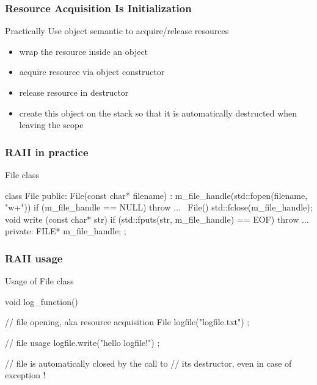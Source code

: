 \begin{frame}
  \frametitle{Resource Acquisition Is Initialization}
  \begin{block}{Practically}
    Use object semantic to acquire/release resources
    \begin{itemize}
    \item wrap the resource inside an object
    \item acquire resource via object constructor
    \item release resource in destructor
    \item create this object on the stack so that it is automatically destructed when leaving the scope
    \end{itemize}
  \end{block}
\end{frame}

\begin{frame}[fragile]
  \frametitle{RAII in practice}
  \begin{exampleblock}{File class}
    \begin{cppcode*}{}
    class File {
    public:
      File(const char* filename) :
        m_file_handle(std::fopen(filename, "w+")) {
        if (m_file_handle == NULL) { throw ... }
      }
      ~File() { std::fclose(m_file_handle); }
      void write (const char* str) {
        if (std::fputs(str, m_file_handle) == EOF) {
          throw ...
        }
      }
    private:
      FILE* m_file_handle;
    };
    \end{cppcode*}
  \end{exampleblock}
\end{frame}

\begin{frame}[fragile]
  \frametitle{RAII usage}
  \begin{exampleblock}{Usage of File class}
    \begin{cppcode*}{}
      void log_function() {
        // file opening, aka resource acquisition
        File logfile("logfile.txt") ;

        // file usage
        logfile.write("hello logfile!") ;
 
        // file is automatically closed by the call to
        // its destructor, even in case of exception !
      }
    \end{cppcode*}
  \end{exampleblock}
\end{frame}

